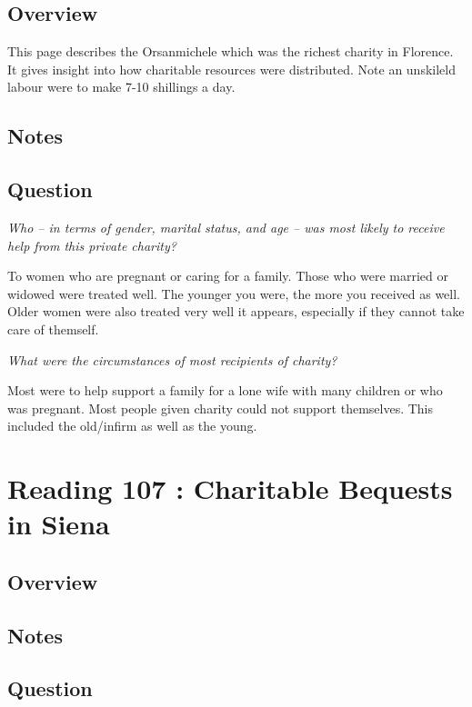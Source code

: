 \documentclass[12pt]{article}
\begin{document}
{\subsection*{Overview}

This page describes the Orsanmichele which was the richest charity in Florence. It gives insight into how charitable resources were distributed. Note an unskileld labour were to make 7-10 shillings a day.

\subsection*{Notes}

\subsection*{Question}

\textit{Who -- in terms of gender, marital status, and age -- was most likely to receive help from this private charity?}

To women who are pregnant or caring for a family. Those who were married or widowed were treated well. The younger you were, the more you received as well. Older women were also treated very well it appears, especially if they cannot take care of themself.

\textit{What were the circumstances of most recipients of charity?}

Most were to help support a family for a lone wife with many children or who was pregnant.  Most people given charity could not support themselves. This included the old/infirm as well as the young.


\section*{Reading 107 : Charitable Bequests in Siena}

\subsection*{Overview}

\subsection*{Notes}

\subsection*{Question}

}
\end{document}

